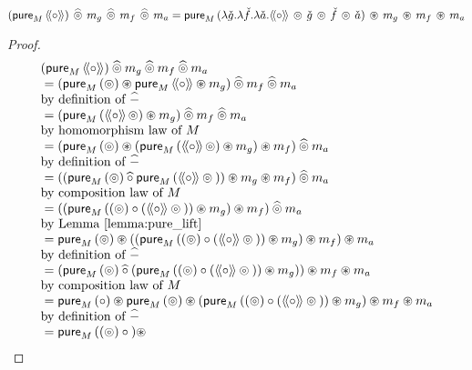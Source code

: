 \begin{lemmaa}{16}\label{lemma:ppair}
$$
(\apure_M\,\ppair{\comp})\, \alift{\pappl}\, m_g\, \alift{\pappl}\, m_f\, \alift{\pappl}\, m_a
= \apure_M\,(\lambda \pstr{g}. \lambda \pstr{f}. \lambda \pstr{a}. \ppair{\comp}\, \pappl\, \pstr{g} \, \pappl\, \pstr{f} \, \pappl\, \pstr{a})\, \appl\, m_g\, \appl\, m_f\, \appl\, m_a 
$$
\end{lemmaa}
\begin{proof}
$$
\begin{array}{ll}
(\apure_M\,\ppair{\comp}) \alift{\pappl} m_g \alift{\pappl} m_f \alift{\pappl} m_a\\
{}=
(\apure_M\,(\pappl) \appl \apure_M\,\ppair{\comp} \appl m_g) \alift{\pappl} m_f \alift{\pappl} m_a\\
\mbox{by definition of }\alift{-}\\
{}= (\apure_M\,(\ppair{\comp}\, \pappl) \appl m_g) \alift{\pappl} m_f \alift{\pappl} m_a\\
 \mbox{by homomorphism law of }M\\
{}= (\apure_M\,(\pappl) \appl (\apure_M\,(\ppair{\comp}\, \pappl) \appl m_g) \appl m_f) \alift{\pappl} m_a\\
\mbox{by definition of }\alift{-}\\
{}= (
       (\apure_M\,(\pappl) \alift{\comp} \apure_M\,(\ppair{\comp} \pappl {}))
       \appl m_g
     \appl m_f) \alift{\pappl} m_a\\
\mbox{by composition law of }M\\
{}= ((
       \apure_M\,((\pappl) \comp (\ppair{\comp} \pappl {}))
       \appl m_g
     ) \appl m_f) \alift{\pappl} m_a\\
\mbox{by Lemma \ref{lemma:pure_lift}}\\
{}= \apure_M\,(\pappl) \appl
    ((
       \apure_M\,((\pappl) \comp (\ppair{\comp} \pappl {}))
       \appl m_g
     ) \appl m_f) \appl m_a\\
\mbox{by definition of }\alift{-}\\
{}= (\apure_M\,(\pappl) \alift{\comp}
     (\apure_M\,((\pappl) \comp (\ppair{\comp} \pappl {}))
       \appl m_g))
    \appl m_f \appl m_a\\
\mbox{by composition law of }M\\
{}= \apure_M\,(\comp) \appl
     \apure_M\,(\pappl) \appl
     (\apure_M\,((\pappl) \comp (\ppair{\comp} \pappl {}))
       \appl m_g)
    \appl m_f \appl m_a\\
\mbox{by definition of }\alift{-}\\
{}= \apure_M\,((\pappl) \comp {}) \appl

\end{array}$$
\end{proof}
